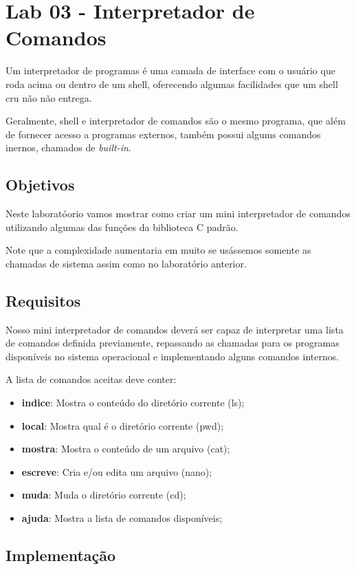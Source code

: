 \chapter{Lab 03 - Interpretador de Comandos}

Um interpretador de programas é uma camada de interface com o usuário que roda acima ou dentro de um shell, oferecendo algumas facilidades que um shell cru não não entrega.

Geralmente, shell e interpretador de comandos são o mesmo programa, que além de fornecer acesso a programas externos, também possui algums comandos inernos, chamados de \emph{built-in}.

\section{Objetivos}

Neste laboratóorio vamos mostrar como criar um mini interpretador de comandos utilizando algumas das funções da biblioteca C padrão.

Note que a complexidade aumentaria em muito se usássemos somente as chamadas de sistema assim como no laboratório anterior.

\section{Requisitos}

Nosso mini interpretador de comandos deverá ser capaz de interpretar uma lista de comandos definida previamente, repassando as chamadas para os programas disponíveis no sistema operacional e implementando alguns comandos internos.

A lista de comandos aceitas deve conter:

\begin{itemize}
\item \textbf{indice}: Mostra o conteúdo do diretório corrente (ls);
\item \textbf{local}: Mostra qual é o diretório corrente (pwd);
\item \textbf{mostra}: Mostra o conteúdo de um arquivo (cat);
\item \textbf{escreve}: Cria e/ou edita um arquivo (nano);
\item \textbf{muda}: Muda o diretório corrente (cd);
\item \textbf{ajuda}: Mostra a lista de comandos disponíveis;
\end{itemize}

\section{Implementação}

